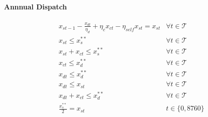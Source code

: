 \documentclass[9pt, oneside]{article}
\numberwithin{equation}{subsubsection}
\begin{document}
\paragraph{Annnual Dispatch}
\begin{subequations}
	\begin{align}
		 & x_{st-1} - \frac{ x_{dt}}{\eta_d} + \eta_c x_{ct} - \eta_{self} x_{st} = x_{st} & \forall t \in \mathcal{T} \label{eqn:es0} \\
		 & x_{st} \leq x_s^{**}                                                            & \forall t \in \mathcal{T} \label{eqn:es1} \\
		 & x_{st}+ x_{ct} \leq x_s^{**}                                                    & \forall t \in \mathcal{T} \label{eqn:es2} \\
		 & x_{ct} \leq x_d^{**}                                                            & \forall t \in \mathcal{T} \label{eqn:es3} \\
		 & x_{dt} \leq x_d^{**}                                                            & \forall t \in \mathcal{T} \label{eqn:es4} \\
		 & x_{dt} \leq x_{st}                                                              & \forall t \in \mathcal{T} \label{eqn:es5} \\
		 & x_{dt} + x_{ct} \leq x_d^{**}                                                   & \forall t \in \mathcal{T} \label{eqn:es6} \\
		 & \frac{ x_{s}^{**} }{2} = x_{st}                                                 & t \in \{0, 8760\}\label{eqn:es7}
	\end{align}
\end{subequations}

\end{document}
